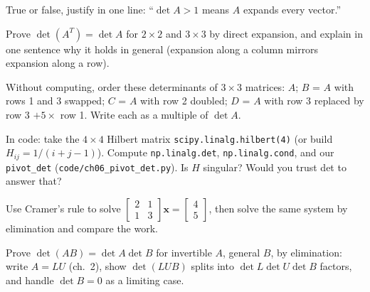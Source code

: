 \begin{exercise}[easy]
True or false, justify in one line: ``$\det A>1$ means $A$ expands every
vector.''
\end{exercise}

\begin{exercise}[medium]
Prove $\det(A^{T})=\det A$ for $2\times2$ and $3\times3$ by direct
expansion, and explain in one sentence why it holds in general (expansion
along a column mirrors expansion along a row).
\end{exercise}

\begin{exercise}[medium]
Without computing, order these determinants of $3\times3$ matrices: $A$;
$B$ = $A$ with rows 1 and 3 swapped; $C$ = $A$ with row 2 doubled;
$D$ = $A$ with row 3 replaced by row 3 $+ 5\times$ row 1. Write each as a
multiple of $\det A$.
\end{exercise}

\begin{exercise}[medium]
In code: take the $4\times4$ Hilbert matrix \texttt{scipy.linalg.hilbert(4)}
(or build $H_{ij}=1/(i+j-1)$). Compute \texttt{np.linalg.det},
\texttt{np.linalg.cond}, and our \texttt{pivot\_det}
(\texttt{code/ch06\_pivot\_det.py}). Is $H$ singular? Would you trust det
to answer that?
\end{exercise}

\begin{exercise}[medium]
Use Cramer's rule to solve
$\begin{bmatrix}2&1\\1&3\end{bmatrix}\mathbf x=\begin{bmatrix}4\\5\end{bmatrix}$,
then solve the same system by elimination and compare the work.
\end{exercise}

\begin{exercise}[hard]
Prove $\det(AB)=\det A\det B$ for invertible $A$, general $B$, by
elimination: write $A=LU$ (ch.~2), show $\det(LU B)$ splits into
$\det L\det U\det B$ factors, and handle $\det B=0$ as a limiting case.
\end{exercise}


